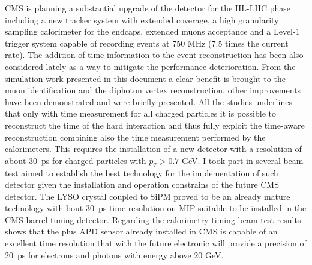 CMS is planning a substantial upgrade of the detector for the HL-LHC phase including a new tracker system
with extended coverage, a high granularity sampling calorimeter for the endcaps, extended muons acceptance and
a Level-1 trigger system capable of recording events at 750 MHz (7.5 times the current rate).
The addition of time information to the event reconstruction has been also considered lately as a way to mitigate the
performance deterioration. From the simulation work presented in this document a clear benefit is brought
to the muon identification and the diphoton vertex reconstruction, other improvements have been demonstrated and were briefly
presented. All the studies underlines that only with time measurement for all charged particles it is possible
to reconstruct the time of the hard interaction and thus fully exploit the time-aware reconstruction combining
also the time measurement performed by the calorimeters. This requires the installation of a new
detector with a resolution of about 30~ps for charged particles with $p_T>0.7$ GeV. I took part in several beam
test aimed to establish the best technology for the implementation of such detector given the installation and operation
constrains of the future CMS detector. The LYSO crystal coupled to SiPM proved to be an already mature
technology with bout 30~ps time resolution on MIP suitable to be installed in the CMS barrel timing detector.
Regarding the calorimetry timing beam test results shows that the \PbWO plus APD sensor already installed in CMS
is capable of an excellent time resolution that with the future electronic will provide a precision of 20~ps
for electrons and photons with energy above $20$ GeV.
